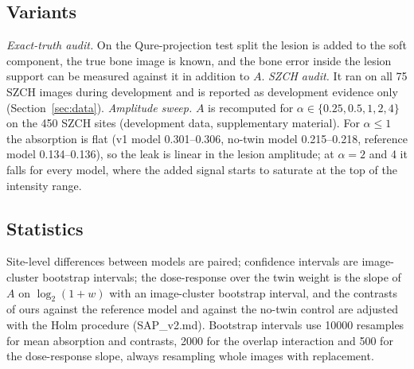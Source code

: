 \subsection{Variants}
\emph{Exact-truth audit.} On the Qure-projection test split the lesion is added to the soft component, the true bone image is known, and the
bone error inside the lesion support can be measured against it in addition to $A$. \emph{SZCH audit.} It ran on all 75 SZCH images during development
and is reported as development evidence only (Section~\ref{sec:data}). \emph{Amplitude sweep.} $A$ is recomputed for
$\alpha\in\{0.25,0.5,1,2,4\}$ on the 450 SZCH sites (development data, supplementary material). For $\alpha\le1$ the absorption is flat
(v1 model 0.301--0.306, no-twin model 0.215--0.218, reference model 0.134--0.136), so the leak is linear in the lesion amplitude; at $\alpha=2$ and
4 it falls for every model, where the added signal starts to saturate at the top of the intensity range.

\subsection{Statistics}
Site-level differences between models are paired; confidence intervals are image-cluster bootstrap intervals; the dose-response over the twin weight is
the slope of $A$ on $\log_2(1+w)$ with an image-cluster bootstrap interval, and the contrasts of ours against the reference model and against the
no-twin control are adjusted with the Holm procedure (SAP\_v2.md). Bootstrap intervals use \num{10000} resamples for mean absorption and contrasts,
\num{2000} for the overlap interaction and 500 for the dose-response slope, always resampling whole images with replacement.
